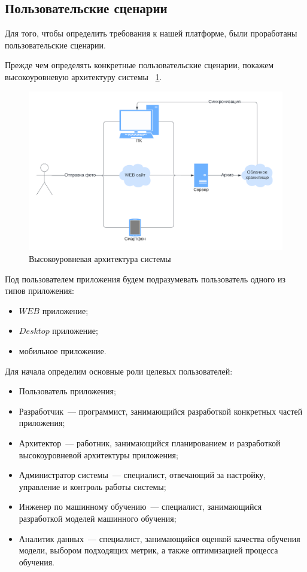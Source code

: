 \subsection{Пользовательские сценарии}
Для того, чтобы определить требования к нашей платформе, были проработаны пользовательские сценарии.

Прежде чем определять конкретные пользовательские сценарии, покажем высокоуровневую архитектуру системы ~\ref{sys_architecture}.

\begin{figure}
    \includegraphics[scale=0.5]{img/use_cases/architecture.png}
    \caption{Высокоуровневая архитектура системы}
    \label{sys_architecture}
\end{figure}

Под пользователем приложения будем подразумевать пользователь одного из типов приложения:
\begin{itemize}
    \item $WEB$ приложение;
    \item $Desktop$ приложение;
    \item мобильное приложение.
\end{itemize}

Для начала определим основные роли целевых пользователей:
\begin{itemize}
    \item Пользователь приложения;
    \item Разработчик~--- программист, занимающийся разработкой конкретных частей приложения;
    \item Архитектор~--- работник, занимающийся планированием и разработкой высокоуровневой архитектуры приложения;
    \item Администратор системы~--- специалист, отвечающий за настройку, управление и контроль работы системы;
    \item Инженер по машинному обучению~--- специалист, занимающийся разработкой моделей машинного обучения;
    \item Аналитик данных~--- специалист, занимающийся оценкой качества обучения модели, выбором подходящих метрик, а также оптимизацией процесса обучения.
\end{itemize}

